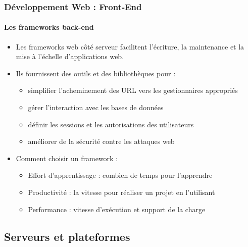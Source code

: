 \documentclass[xcolor=table]{beamer}
\begin{document}
\begin{frame}
\frametitle{Développement Web : Front-End}
\framesubtitle{Les frameworks back-end}

\begin{itemize}
	\item Les frameworks web côté serveur facilitent l'écriture, la maintenance et la mise à l'échelle d'applications web. 
	\item Ils fournissent des outils et des bibliothèques pour :
	\begin{itemize}
		\item simplifier l'acheminement des URL vers les gestionnaires appropriés
		\item gérer l'interaction avec les bases de données
		\item définir les sessions et les autorisations des utilisateurs
		\item améliorer de la sécurité contre les attaques web
	\end{itemize}
	\item Comment choisir un framework :
	\begin{itemize}
		\item Effort d'apprentissage : combien de temps pour l'apprendre
		\item Productivité : la vitesse pour réaliser un projet en l'utilisant
		\item Performance : vitesse d'exécution et support de la charge
	\end{itemize}
\end{itemize}

\end{frame}

\subsection{Serveurs et plateformes}
\end{document}
